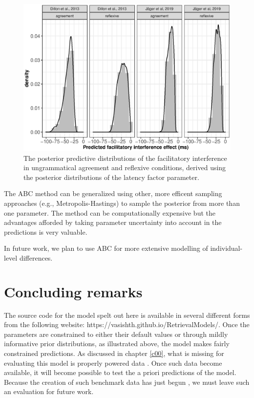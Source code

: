 \documentclass{cambridge7A}\usepackage[]{graphicx}\usepackage[]{color}
\makeatletter
\def\maxwidth{ %
  \ifdim\Gin@nat@width>\linewidth
    \linewidth
  \else
    \Gin@nat@width
  \fi
}
\newenvironment{knitrout}{}{} %
\makeatother
\begin{document}
\begin{figure}[!htbp]
\centering
\begin{knitrout}
\color{fgcolor}

{\centering \includegraphics[width=\maxwidth]{figures/fig-plotppdistrns-1} 

}



\end{knitrout}
\caption{The posterior predictive distributions of the facilitatory interference in ungrammatical agreement and reflexive conditions, derived using the posterior distributions of the latency factor parameter.}\label{fig:ppmeansvalues}
\end{figure}

The ABC method can be generalized using other, more efficent sampling approaches (e.g., Metropolis-Hastings) to sample the posterior from more than one parameter. The method can be computationally expensive but the advantages afforded by taking parameter uncertainty into account in the predictions is very valuable.

In future work, we plan to use ABC for more extensive modelling of individual-level differences.

\section{Concluding remarks}

The source code for the model spelt out here is available in several different forms from the following website: https://vasishth.github.io/RetrievalModels/. Once the parameters are constrained to either their default values or through mildly informative prior distributions, as illustrated above, the model makes fairly constrained predictions. As discussed in chapter \ref{c00}, what is missing for evaluating this model is properly powered data \citep{rp}. Once such data become available, it will become possible to test the a priori predictions of the model. Because the creation of such benchmark data has just begun \citep{VasishthMertzenJaegerGelman2018,JaegerMertzenVanDykeVasishth2019,MertzenEtAlAMLaP2019}, we must leave such an evaluation for future work. 
\end{document}
